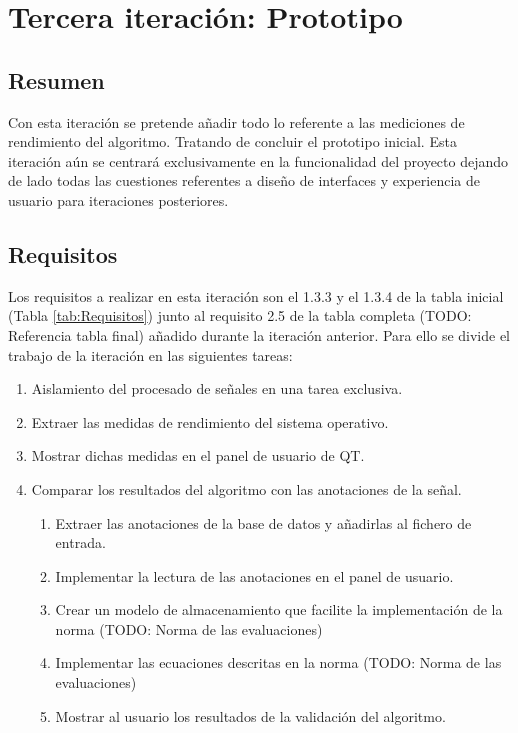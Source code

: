 
\section{Tercera iteración: Prototipo}
    \subsection{Resumen}
        
        Con esta iteración se pretende añadir todo lo referente a las mediciones de rendimiento del algoritmo. Tratando de concluir el prototipo inicial. Esta iteración aún se centrará exclusivamente en la funcionalidad del proyecto dejando de lado todas las cuestiones referentes a diseño de interfaces y experiencia de usuario para iteraciones posteriores.
        
    \subsection{Requisitos}

        Los requisitos a realizar en esta iteración son el 1.3.3 y el 1.3.4 de la tabla inicial (Tabla \ref{tab:Requisitos}) junto al requisito 2.5 de la tabla completa (TODO: Referencia tabla final) añadido durante la iteración anterior. Para ello se divide el trabajo de la iteración en las siguientes tareas:

        \begin{enumerate}
            \item Aislamiento del procesado de señales en una tarea exclusiva.
            \item Extraer las medidas de rendimiento del sistema operativo.
            \item Mostrar dichas medidas en el panel de usuario de QT.
            \item Comparar los resultados del algoritmo con las anotaciones de la señal.
            \begin{enumerate}
                \item Extraer las anotaciones de la base de datos y añadirlas al fichero de entrada.
                \item Implementar la lectura de las anotaciones en el panel de usuario.
                \item Crear un modelo de almacenamiento que facilite la implementación de la norma (TODO: Norma de las evaluaciones)
                \item Implementar las ecuaciones descritas en la norma (TODO: Norma de las evaluaciones)
                \item Mostrar al usuario los resultados de la validación del algoritmo.
            \end{enumerate}
        \end{enumerate}
        
